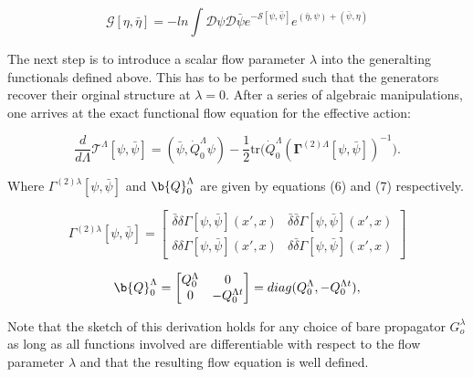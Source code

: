 \documentclass[12pt]{article}
\begin{document}
\begin{equation}\label{G term in effective action}
\mathcal{G}[\eta, \bar{\eta}] = 
-ln \int{\mathcal{D}\psi \mathcal{D} \bar{\psi}e^{-\mathcal{S}[\psi, \bar{\psi}]}e^{(\bar{\eta}, \psi) +(\bar{\psi}, \eta)}}
\end{equation}

The next step is to introduce a scalar flow parameter $\lambda$ into the generalting functionals defined above. This has to be performed such that the generators recover their orginal structure at $\lambda = 0 $. After a series of algebraic manipulations, one arrives at the exact functional flow equation for the effective action:


\begin{equation} \label{eq:ExactFunctionalFlowEquation}
    \frac{d}{d\Lambda} \mathcal{T}^{\Lambda}[\psi, \bar{\psi}] = (\bar{\psi}, \dot{Q}_0^{\Lambda} \psi) - \frac{1}{2} \text{tr} \big( \dot{Q}_0^{\Lambda} (\boldsymbol{\Gamma}^{(2)\Lambda}[\psi, \bar{\psi}])^{-1} \big).
\end{equation}

Where $\Gamma^{(2)\lambda}[\psi, \bar{\psi}]$ and  $\b{Q}_0^{\Lambda}$ are given by equations (6) and (7) respectively.



\begin{equation}\label{Gamma term}
\Gamma^{(2)\lambda}[\psi, \bar{\psi}] = 
\begin{bmatrix}
\bar{\delta} \delta \Gamma[\psi, \bar{\psi}](x',x) & \bar{\delta} \bar{\delta} \Gamma[\psi, \bar{\psi}](x',x) \\
\delta \delta \Gamma[\psi, \bar{\psi}](x',x)  & \delta \bar{\delta} \Gamma[\psi, \bar{\psi}](x',x)
\end{bmatrix}
\end{equation}



\begin{equation}\label{Q0 term }
\b{Q}_0^{\Lambda} =
\begin{bmatrix}
Q_0^{\Lambda} & 0 \\
0 & -Q_0^{\Lambda t}
\end{bmatrix}
= diag(Q_0^{\Lambda}, - Q_0^{\Lambda t}),
\end{equation}

Note that the sketch of this derivation holds for any choice of bare propagator $G_o^{\lambda}$ as long as all functions involved are differentiable with respect to the flow parameter $\lambda$ and that the resulting flow equation is well defined. 
\end{document}
